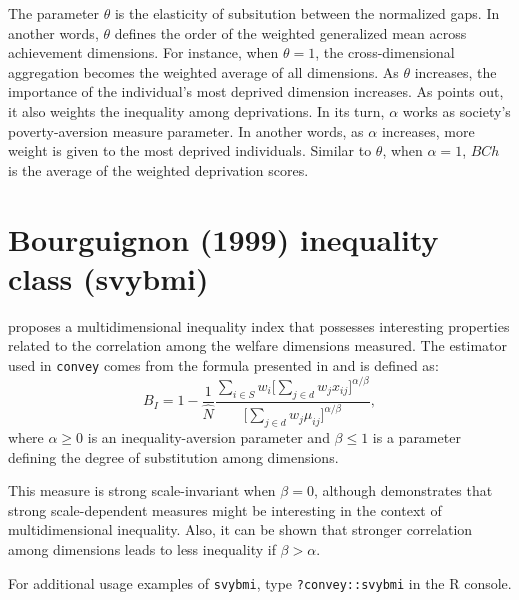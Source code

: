 \documentclass[]{book}
\begin{document}
The parameter \(\theta\) is the elasticity of subsitution between the
normalized gaps. In another words, \(\theta\) defines the order of the
weighted generalized mean across achievement dimensions. For instance,
when \(\theta = 1\), the cross-dimensional aggregation becomes the
weighted average of all dimensions. As \(\theta\) increases, the
importance of the individual's most deprived dimension increases. As
\citet{vega2009} points out, it also weights the inequality among
deprivations. In its turn, \(\alpha\) works as society's
poverty-aversion measure parameter. In another words, as \(\alpha\)
increases, more weight is given to the most deprived individuals.
Similar to \(\theta\), when \(\alpha = 1\), \(BCh\) is the average of
the weighted deprivation scores.

\section{Bourguignon (1999) inequality class
(svybmi)}\label{bourguignon-1999-inequality-class-svybmi}

\citet{bourguignon1999} proposes a multidimensional inequality index
that possesses interesting properties related to the correlation among
the welfare dimensions measured. The estimator used in \texttt{convey}
comes from the formula presented in \citet{lugo2007} and is defined as:
\[
B_{I} = 1 - \frac{1}{ \widehat{N} } \frac{ \sum_{ i \in S } w_i \bigg[ \sum_{ j \in d } w_j x_{ij} \bigg]^{ \alpha / \beta } }{ 
\bigg[ \sum_{ j \in d } w_j \mu_{ij} \bigg]^{ \alpha / \beta } },
\] where \(\alpha \geqslant 0\) is an inequality-aversion parameter and
\(\beta \leqslant 1\) is a parameter defining the degree of substitution
among dimensions.

This measure is strong scale-invariant when \(\beta = 0\), although
\citet{bourguignon1999} demonstrates that strong scale-dependent
measures might be interesting in the context of multidimensional
inequality. Also, it can be shown that stronger correlation among
dimensions leads to less inequality if \(\beta > \alpha\).

For additional usage examples of \texttt{svybmi}, type
\texttt{?convey::svybmi} in the R console.


\end{document}

